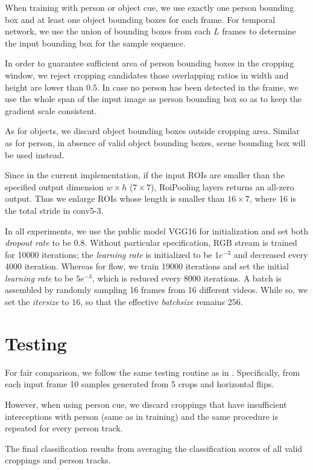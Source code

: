 When training with person or object cue, we use exactly one person bounding box and at least one object bounding boxes for each frame.
For temporal network, we use the union of bounding boxes from each $ L $ frames to determine the input bounding box for the sample sequence.

In order to guarantee sufficient area of person bounding boxes in the cropping window, we reject cropping candidates those overlapping ratios in width and height are lower than $ 0.5 $.
In case no person has been detected in the frame, we use the whole span of the input image as person bounding box so as to keep the gradient scale consistent.

As for objects, we discard object bounding boxes outside cropping area. 
Similar as for person, in absence of valid object bounding boxes, scene bounding box will be used instead.

Since in the current implementation, if the input ROIs are smaller than the specified output dimension $ w \times h $ ($ 7\times7 $), RoiPooling layers returns an all-zero output. 
Thus we enlarge ROIs whose length is smaller than $ 16\times7 $, where 16 is the total stride in conv5-3.

In all experiments, we use the public model VGG16 \cite{simonyan2014very} for initialization and set both \textit{dropout rate} to be $ 0.8 $. 
Without particular specification, RGB stream is trained for 10000 iterations; the \textit{learning rate} is initialized to be $ 1e^{-3} $ and decreased every 4000 iteration.
Whereas for flow, we train 19000 iterations and set the initial \textit{learning rate} to be $ 5e^{-3} $, which is reduced every 8000 iterations.
A batch is assembled by randomly sampling 16 frames from 16 different videos. 
While so, we set the \textit{itersize} to $ 16 $, so that the effective \textit{batchsize} remains $ 256 $.

\section{Testing}
For fair comparison, we follow the same testing routine as in \cite{simonyan2014two}.
Specifically, from each input frame 10 samples generated from 5 crops and horizontal flips. 

However, when using person cue, we discard croppings that have insufficient interceptions with person (same as in training) and the same procedure is repeated for every person track. 

The final classification results from averaging the classification scores of all valid croppings and person tracks.